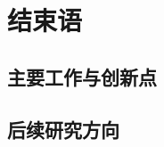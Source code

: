 \chapter{结束语}
\label{chap:con}

\section{主要工作与创新点}
\label{sec:con:job}

\section{后续研究方向}
\label{sec:con:future}